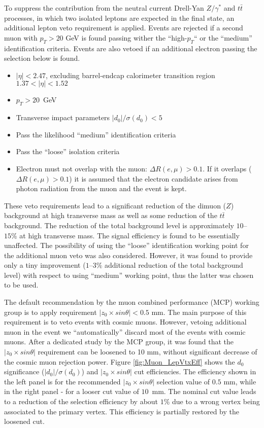 To suppress the contribution from the neutral current Drell-Yan $Z/\gamma^*$ and $t\bar{t}$ processes,
in which two isolated leptons are expected in the final state, an additional lepton veto requirement
is applied. 
Events are rejected if a second muon with $p_T > 20$ GeV is found passing
wither the ``high-$p_T$`` or the ``medium'' identification criteria.
Events are also vetoed if an additional electron passing the selection below is found.
\begin{itemize}
\item $|\eta| < 2.47$, excluding barrel-endcap calorimeter transition region $1.37 < |\eta| < 1.52$
\item $p_T > 20$~GeV
\item Transverse impact parameters $|d_0|/\sigma(d_0) < 5$
\item Pass the likelihood ``medium'' identification criteria~\cite{ATL-PHYS-PUB-2015-041}
\item Pass the ``loose'' isolation criteria~\cite{ATLAS-CONF-2016-024}
\item Electron must not overlap with the muon: $\Delta R(e,\mu)>0.1$. If it overlaps ($\Delta R(e,\mu)>0.1$)
it is assumed that the electron candidate arises from photon radiation from the muon and the event is kept.
\end{itemize}
These veto requirements lead to a significant reduction of the dimuon ($Z$) background
at high transverse mass as well as some reduction of the $t\bar{t}$ background.
The reduction of the total background level is approximately $10$--$15\%$ at high transverse mass. 
The signal efficiency is found to be essentially unaffected.
The possibility of using the ``loose'' identification working point for the additional muon veto was also considered. However, it was found to provide only a tiny improvement ($1$--$3\%$ additional reduction of the total background level) with respect to using ``medium'' working point, thus the latter was chosen to be used.

The default recommendation by the muon combined performance (MCP) working group is to apply requirement $|z_0 \times sin \theta| < 0.5$ mm. The main purpose of this requirement is to veto events with cosmic muons.
However, vetoing additional muon in the event we ``automatically'' discard most of the events with cosmic muons. After a dedicated study by the MCP group, it was found that the 
$|z_0 \times sin \theta|$ requirement can be loosened to 10 mm, without significant decrease of the cosmic muon rejection power.
Figure \ref{fig:Muon_LepVtxEff} shows the $d_0$ significance ($|d_0|/\sigma(d_0)$) and $|z_0 \times sin \theta|$ cut efficiencies. The efficiency shown in the left panel is for the recommended $|z_0 \times sin \theta|$ selection value of $0.5$ mm, while in the right panel - for a looser
cut value of $10$~mm. The nominal cut value leads to a reduction of the selection efficiency by about $1$\% due to a wrong vertex being associated to the primary vertex. This efficiency is partially restored by the loosened cut.

